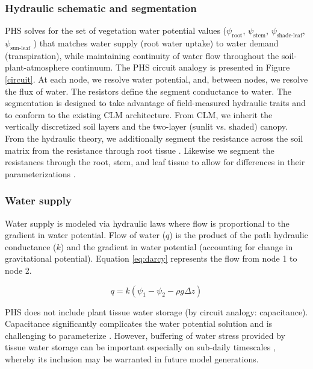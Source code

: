 \documentclass[draft,linenumbers]{agujournal}
\begin{document}
  \subsubsection{Hydraulic schematic and segmentation}
  PHS solves for the set of vegetation water potential values 
  ($\psi_{\text{root}}$, $\psi_{\text{stem}}$, $\psi_{\text{shade-leaf}}$, $\psi_{\text{sun-leaf}}$ ) 
  that matches water supply (root water uptake) to water demand (transpiration), 
  while maintaining continuity of water flow throughout the soil-plant-atmosphere continuum.
  The PHS circuit analogy is presented in Figure \ref{circuit}.
  At each node, we resolve water potential, and, between nodes, we resolve the flux of water.
  The resistors define the segment conductance to water. 
  The segmentation is designed to take advantage of field-measured hydraulic traits 
  and to conform to the existing CLM architecture.
  From CLM, we inherit the vertically discretized soil layers and the two-layer (sunlit vs. shaded) canopy.
  From the hydraulic theory, we additionally segment the resistance across the soil matrix from the 
  resistance through root tissue \citep{williams1996}. 
  Likewise we segment the resistances through the root, stem, and leaf tissue to allow for differences
  in their parameterizations \citep{simonin2015, sperry2015}.

    \subsubsection{Water supply}
    \label{sect:supply}
    Water supply is modeled via hydraulic laws where flow is proportional to the gradient in water potential. 
    Flow of water ($q$) is the product of the path hydraulic conductance ($k$) and 
    the gradient in water potential (accounting for change in gravitational potential). 
    Equation \ref{eq:darcy} represents the flow from node 1 to node 2. 
    
     \begin{linenomath*}
     \begin{equation}
     \label{eq:darcy}
     q = k\left(\psi_1 - \psi_2 - \rho g \Delta z\right)
     \end{equation}
     \end{linenomath*}
    
    PHS does not include plant tissue water storage (by circuit analogy: capacitance). 
    Capacitance significantly complicates the water potential solution \citep{celia1990}
    and is challenging to parameterize \citep{bartlett2016}.
    However, buffering of water stress provided by tissue water storage can be important
    especially on sub-daily timescales \citep{meinzer2009}, whereby its inclusion may be warranted 
    in future model generations.
\end{document}
